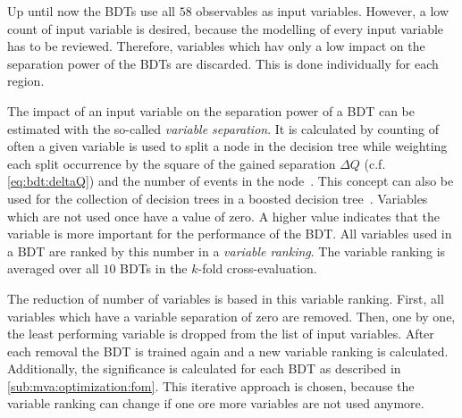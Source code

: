 Up until now the BDTs use all $58$ observables as input variables.
However, a low count of input variable is desired, because the modelling of every input variable has to be reviewed.
Therefore, variables which hav only a low impact on the separation power of the BDTs are discarded.
This is done individually for each region.

The impact of an input variable on the separation power of a BDT can be estimated with the so-called \emph{variable separation}.
It is calculated by counting of often a given variable is used to split a node in the decision tree while
weighting each split occurrence by the square of the gained separation $\Delta Q$ (c.f. \cref{eq:bdt:deltaQ})
and the number of events in the node~\cite{Breiman1984}.
This concept can also be used for the collection of decision trees in a boosted decision tree~\cite{TMVA}.
Variables which are not used once have a value of zero.
A higher value indicates that the variable is more important for the performance of the BDT\@.
All variables used in a BDT are ranked by this number in a \emph{variable ranking}.
The variable ranking is averaged over all $10$ BDTs in the $k$-fold cross-evaluation.

The reduction of number of variables is based in this variable ranking.
First, all variables which have a variable separation of zero are removed.
Then, one by one, the least performing variable is dropped from the list of input variables.
After each removal the BDT is trained again and a new variable ranking is calculated.
Additionally, the significance is calculated for each BDT as described in \cref{sub:mva:optimization:fom}.
This iterative approach is chosen, because the variable ranking can change if one ore more variables are not used anymore.

